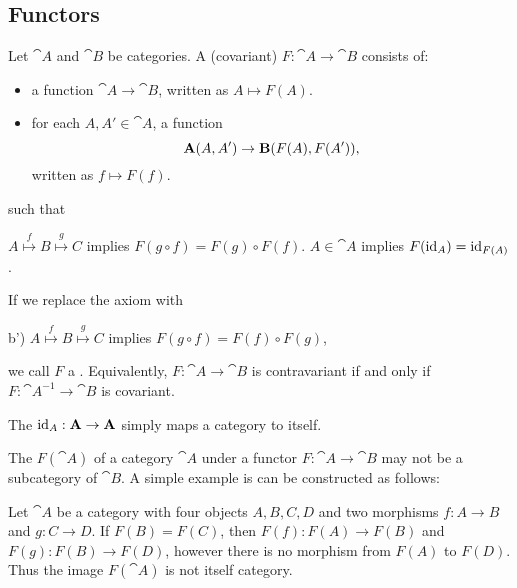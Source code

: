 \subsection{Functors}\label{subsec:functors}

\begin{definition}\label{def:functor}
  Let \( \cat{A} \) and \( \cat{B} \) be categories. A (covariant)  \( F: \cat{A} \to \cat{B} \) consists of:
  \begin{itemize}
    \item a function \( \cat{A} \to \cat{B} \), written as \( A \mapsto F(A) \).
    \item for each \( A, A' \in \cat{A} \), a function
          \begin{equation*}
            \operatorname{\mathbf{A}}(A, A') \to \operatorname{\mathbf{B}}(F(A), F(A')),
          \end{equation*}
          written as \( f \mapsto F(f) \).
  \end{itemize}
  such that
  \begin{thmenum}
     \( A \overset f \mapsto B \overset g \mapsto C \) implies \( F(g \circ f) = F(g) \circ F(f) \).
     \( A \in \cat{A} \) implies \( F(\operatorname{id}_A) = \operatorname{id}_{F(A)} \).
  \end{thmenum}

  If we replace the axiom  with
  \begin{thmenum}
    \item[b')]\label{def:functor/contravariant_composition_axiom} \( A \overset f \mapsto B \overset g \mapsto C \) implies \( F(g \circ f) = F(f) \circ F(g) \),
  \end{thmenum}
  we call \( F \) a . Equivalently, \( F: \cat{A} \to \cat{B} \) is contravariant if and only if \( F: \cat{A}^{-1} \to \cat{B} \) is covariant.

  The  \( \operatorname{id}_A: \operatorname{\mathbf{A}} \to \operatorname{\mathbf{A}} \) simply maps a category to itself.
\end{definition}

\begin{remark}\label{rem:image_of_functor_maybe_not_subcategory}
  The  \( F(\cat{A}) \) of a category \( \cat{A} \) under a functor \( F: \cat{A} \to \cat{B} \) may not be a subcategory of \( \cat{B} \). A simple example is can be constructed as follows:

  Let \( \cat{A} \) be a category with four objects \( A, B, C, D \) and two morphisms \( f: A \to B \) and \( g: C \to D \). If \( F(B) = F(C) \), then \( F(f): F(A) \to F(B) \) and \( F(g): F(B) \to F(D) \), however there is no morphism from \( F(A) \) to \( F(D) \). Thus the image \( F(\cat{A}) \) is not itself category.
\end{remark}


